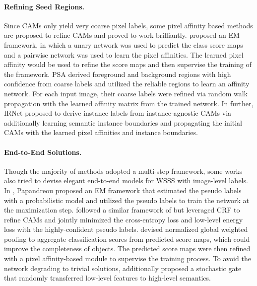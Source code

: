 \paragraph{\textbf{Refining Seed Regions.}} Since CAMs only yield very coarse pixel labels, some pixel affinity based methods are proposed to refine CAMs and proved to work brilliantly. \citep{wang2020weakly} proposed an EM framework, in which a unary network was used to predict the class score maps and a pairwise network was used to learn the pixel affinities. The learned pixel affinity would be used to refine the score maps and then supervise the training of the framework. PSA \citep{ahn2018learning} derived foreground and background regions with high confidence from coarse labels and utilized the reliable regions to learn an affinity network. For each input image, their coarse labels were refined via random walk propagation \citep{vernaza2017learning} with the learned affinity matrix from the trained network. In further, IRNet \citep{ahn2019weakly} proposed to derive instance labels from instance-agnostic CAMs via additionally learning semantic instance boundaries and propagating the initial CAMs with the learned pixel affinities and instance boundaries.

\paragraph{\textbf{End-to-End Solutions.}} Though the majority of methods adopted a multi-step framework, some works also tried to devise elegant end-to-end models for WSSS with image-level labels. In \citep{papandreou2015weakly}, Papandreou \etal proposed an EM framework that estimated the pseudo labels with a probabilistic model and utilized the pseudo labels to train the network at the maximization step. \citep{zhang2020reliability} followed a similar framework of \citep{papandreou2015weakly} but leveraged CRF to refine CAMs and jointly minimized the cross-entropy loss and low-level energy loss with the highly-confident pseudo labels. \citep{araslanov2020single} devised normalized global weighted pooling to aggregate classification scores from predicted score maps, which could improve the completeness of objects. The predicted score maps were then refined with a pixel affinity-based module to supervise the training process. To avoid the network degrading to trivial solutions, \citep{araslanov2020single} additionally proposed a stochastic gate that randomly transferred low-level features to high-level semantics.

